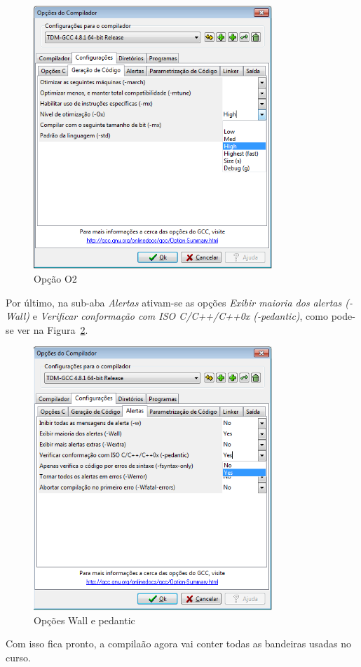 \documentclass[12pt, a4paper]{article}
\begin{document}
\begin{figure}[H]
  \centering
  \includegraphics[width=90mm]{Imagens/3.png}
  \caption{Opção O2}
\label{fig:3}
\end{figure}

Por último, na sub-aba \emph{Alertas} ativam-se as opções \emph{Exibir maioria dos alertas (-Wall)} e \emph{Verificar conformação com ISO C/C++/C++0x (-pedantic)}, como pode-se ver na Figura~\ref{fig:4}. 

\begin{figure}[H]
  \centering
  \includegraphics[width=90mm]{Imagens/4.png}
  \caption{Opções Wall e pedantic}
\label{fig:4}
\end{figure}

Com isso fica pronto, a compilaão agora vai conter todas as bandeiras usadas no curso.
\end{document}
